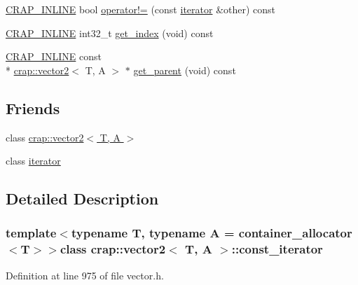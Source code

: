 \begin{DoxyCompactItemize}
\hyperlink{config__x86_8h_a5a40526b8d842e7ff731509998bb0f1c}{C\+R\+A\+P\+\_\+\+I\+N\+L\+I\+N\+E} bool \hyperlink{classcrap_1_1vector2_1_1const__iterator_aa2728eddf4287569662a0e16cd61bda7}{operator!=} (const \hyperlink{classcrap_1_1vector2_1_1iterator}{iterator} \&other) const 
\item 
\hyperlink{config__x86_8h_a5a40526b8d842e7ff731509998bb0f1c}{C\+R\+A\+P\+\_\+\+I\+N\+L\+I\+N\+E} int32\+\_\+t \hyperlink{classcrap_1_1vector2_1_1const__iterator_ab7527c0222e56ef23749f803ce290da5}{get\+\_\+index} (void) const 
\item 
\hyperlink{config__x86_8h_a5a40526b8d842e7ff731509998bb0f1c}{C\+R\+A\+P\+\_\+\+I\+N\+L\+I\+N\+E} const \\*
\hyperlink{classcrap_1_1vector2}{crap\+::vector2}$<$ T, A $>$ $\ast$ \hyperlink{classcrap_1_1vector2_1_1const__iterator_a0beff4524047bfa49c7090507911ded4}{get\+\_\+parent} (void) const 
\end{DoxyCompactItemize}
\subsection*{Friends}
\begin{DoxyCompactItemize}
\item 
class \hyperlink{classcrap_1_1vector2_1_1const__iterator_a142d8169185e0b8e0853b453e03d366f}{crap\+::vector2$<$ T, A $>$}
\item 
class \hyperlink{classcrap_1_1vector2_1_1const__iterator_a67171474c4da6cc8efe0c7fafefd2b2d}{iterator}
\end{DoxyCompactItemize}


\subsection{Detailed Description}
\subsubsection*{template$<$typename T, typename A = container\+\_\+allocator$<$\+T$>$$>$class crap\+::vector2$<$ T, A $>$\+::const\+\_\+iterator}



Definition at line 975 of file vector.\+h.



